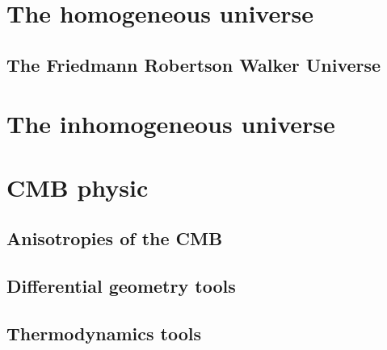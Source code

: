 \documentclass[12pt,a4paper]{book}
\begin{document}
\frontmatter 

\null\thispagestyle{empty}
\newpage

 
\tableofcontents

\mainmatter
\setlength{\parskip}{.5em} %
\part{The homogeneous universe}
\chapter{The Friedmann Robertson Walker Universe}





\part{The inhomogeneous universe}



\part{CMB physic}
\chapter{Anisotropies of the CMB}




\appendix
\chapter{Differential geometry tools}

\chapter{Thermodynamics tools}



 
  
\end{document}

